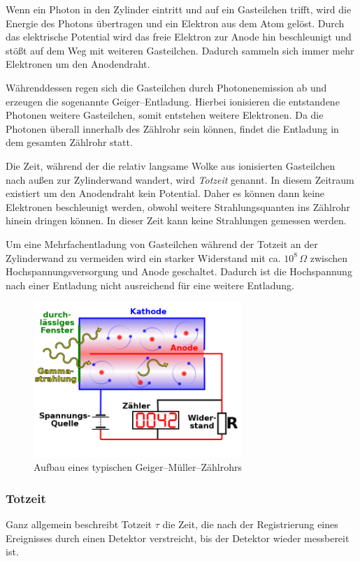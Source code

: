 \documentclass[12pt,a4paper]{scrartcl}
\numberwithin{equation}{section} %
\renewcommand{\[}{} %
\renewcommand{\]}{\noindent} %
\begin{document}
Wenn ein Photon in den Zylinder eintritt und auf ein Gasteilchen trifft, wird die Energie des Photons übertragen und ein Elektron aus dem Atom gelöst. Durch das elektrische Potential wird das freie Elektron zur Anode hin beschleunigt und stößt auf dem Weg mit weiteren Gasteilchen. Dadurch sammeln sich immer mehr Elektronen um den Anodendraht.

Währenddessen regen sich die Gasteilchen durch Photonenemission ab und erzeugen die sogenannte Geiger--Entladung. Hierbei ionisieren die entstandene Photonen weitere Gasteilchen, somit entstehen weitere Elektronen. Da die Photonen überall innerhalb des Zählrohr sein können, findet die Entladung in dem gesamten Zählrohr statt.

Die Zeit, während der die relativ langsame Wolke aus ionisierten Gasteilchen nach außen zur Zylinderwand wandert, wird \emph{Totzeit} genannt. In diesem Zeitraum existiert um den Anodendraht kein Potential. Daher es können dann keine Elektronen beschleunigt werden, obwohl weitere Strahlungsquanten ins Zählrohr hinein dringen können. In dieser Zeit kann keine Strahlungen gemessen werden.

Um eine Mehrfachentladung von Gasteilchen während der Totzeit an der Zylinderwand zu vermeiden wird ein starker Widerstand mit ca. $10^8\,\Omega$ zwischen Hochspannungsversorgung und Anode geschaltet. Dadurch ist die Hochspannung nach einer Entladung nicht ausreichend für eine weitere Entladung.

\begin{figure}[h!]
	\centering
	\includegraphics[width=0.7\textwidth]{../media/B3.1/640px-Geiger_Mueller_Counter_with_Circuit-de.svg.png}
	\caption{Aufbau eines typischen Geiger--Müller--Zählrohrs \cite{File:Geigerzählrohr}}
	\label{fig:Geiger--Müller--Zählrohr}
\end{figure}

\subsubsection{Totzeit}
\label{Totzeit}
Ganz allgemein beschreibt Totzeit $\tau$ die Zeit, die nach der Registrierung eines Ereignisses durch einen Detektor verstreicht, bis der Detektor wieder messbereit ist. \cite{Totzeit}
\end{document}
